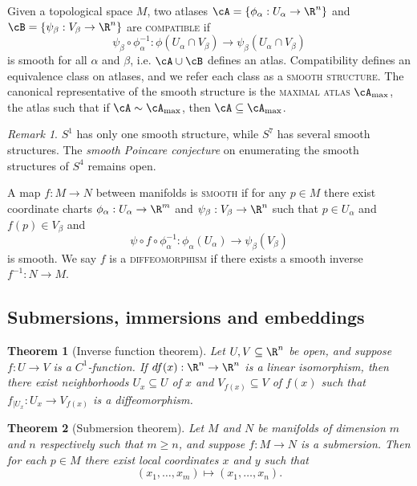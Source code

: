 \documentclass[reqno]{amsart}
\newtheorem{theorem}{Theorem}
\theoremstyle{definition}
\theoremstyle{remark}
\newtheorem*{remark}{Remark}
\renewcommand{\emph}{\textsc}
\begin{document}
Given a topological space $M$, two atlases $\cA = \{ \phi_\alpha : U_\alpha \to \R^n \}$ and $\cB = \{ \psi_\beta : V_\beta \to \R^n\}$ are \emph{compatible} if 
	\[  \psi_\beta \circ \phi_\alpha^{-1} : \phi(U_\alpha \cap V_\beta) \to \psi_\beta (U_\alpha \cap V_\beta) \]
is smooth for all $\alpha$ and $\beta$, i.e. $\cA \cup \cB$ defines an atlas. Compatibility defines an equivalence class on atlases, and we refer each class as a \emph{smooth structure}. The canonical representative of the smooth structure is the \emph{maximal atlas} $\cA_{\text{max}}$, the atlas such that if $\cA \sim \cA_{\text{max}}$, then $\cA \subseteq \cA_{\text{max}}$. 

\begin{remark}
	$S^1$ has only one smooth structure, while $S^7$ has several smooth structures. The \textit{smooth Poincare conjecture} on enumerating the smooth structures of $S^4$ remains open. 
\end{remark}

A map $f: M \to N$ between manifolds is \emph{smooth} if for any $p \in M$ there exist coordinate charts $\phi_\alpha: U_\alpha \to \R^m$ and $\psi_\beta : V_\beta \to \R^n$ such that $p \in U_\alpha$ and $f(p) \in V_\beta$ and 
	\[ \psi \circ f \circ \phi_\alpha^{-1} : \phi_\alpha (U_\alpha) \to \psi_\beta (V_\beta) \]
is smooth. We say $f$ is a \emph{diffeomorphism} if there exists a smooth inverse $f^{-1} : N \to M$. 

\subsection{Submersions, immersions and embeddings}



\begin{theorem}[Inverse function theorem]
	Let $U, V \subseteq \R^n$ be open, and suppose $f: U \to V$ is a $C^1$-function. If $df(x) : \R^n \to \R^n$ is a linear isomorphism, then there exist neighborhoods $U_x \subseteq U$ of $x$ and $V_{f(x)} \subseteq V$ of $f(x)$ such that $f_{|U_x}: U_x \to V_{f(x)}$ is a diffeomorphism. 
\end{theorem}

\begin{theorem}[Submersion theorem]
	Let $M$ and $N$ be manifolds of dimension $m$ and $n$ respectively such that $m \geq n$, and suppose $f: M \to N$ is a submersion. Then for each $p \in M$ there exist local coordinates $x$ and $y$ such that 
		\[ (x_1, \dots, x_m) \mapsto (x_1, \dots, x_n). \]
\end{theorem}
\end{document}
